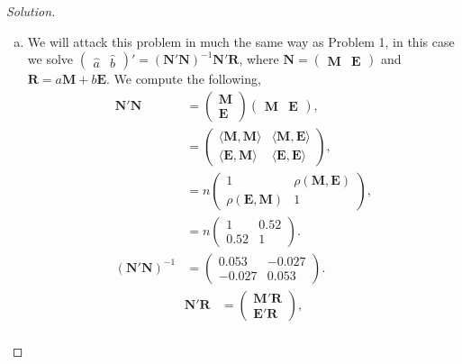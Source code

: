 \documentclass{amsart}
\newcommand{\bvec}[1]{{\boldsymbol #1}}
\begin{document}
			\begin{proof}[Solution] \
				\begin{enumerate}[(a)]
					\item We will attack this problem in much the same way as Problem 1, in this case we solve $\begin{pmatrix} \hat{a} & \hat{b} \end{pmatrix}' = (\bvec{N}'\bvec{N})^{-1}\bvec{N}'\bvec{R}$, where $\bvec{N} = \begin{pmatrix} \bvec{M} & \bvec{E} \end{pmatrix}$ and $\bvec{R} = a\bvec{M} + b\bvec{E}$. We compute the following,
						\begin{align*}
							\bvec{N}'\bvec{N} &= \begin{pmatrix} \bvec{M} \\ \bvec{E} \end{pmatrix} \begin{pmatrix} \bvec{M} & \bvec{E} \end{pmatrix}, \\
							&= \begin{pmatrix}
								\langle \bvec{M},\bvec{M} \rangle & \langle \bvec{M},\bvec{E} \rangle \\
								\langle \bvec{E},\bvec{M} \rangle & \langle \bvec{E},\bvec{E} \rangle
							\end{pmatrix}, \\
							&= n \begin{pmatrix}
								1 & \rho(\bvec{M},\bvec{E}) \\
								\rho(\bvec{E},\bvec{M}) & 1
							\end{pmatrix}, \\
							&= n \begin{pmatrix}
								1 & 0.52 \\
								0.52 & 1
							\end{pmatrix}. \\
							(\bvec{N}'\bvec{N})^{-1} &= \begin{pmatrix}
								0.053 & -0.027 \\
								-0.027 & 0.053
							\end{pmatrix}.
						\end{align*}
						\begin{align*}
							\bvec{N}'\bvec{R} &= \begin{pmatrix}
								\bvec{M}'\bvec{R} \\ \bvec{E}'\bvec{R}
							\end{pmatrix}, \\

\end{align*}
\end{enumerate}
\end{proof}
\end{document}
